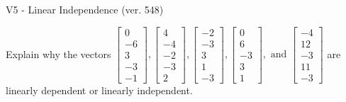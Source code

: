 \begin{exercise}
  \begin{exerciseTitle}V5 - Linear Independence (ver. 548)\end{exerciseTitle}
  \begin{exerciseStatement}
    Explain why the vectors \(\left[\begin{array}{r}
0 \\
-6 \\
3 \\
-3 \\
-1
\end{array}\right] , \left[\begin{array}{r}
4 \\
-4 \\
-2 \\
-3 \\
2
\end{array}\right] , \left[\begin{array}{r}
-2 \\
-3 \\
3 \\
1 \\
-3
\end{array}\right] , \left[\begin{array}{r}
0 \\
6 \\
-3 \\
3 \\
1
\end{array}\right] , \text{ and } \left[\begin{array}{r}
-4 \\
12 \\
-3 \\
11 \\
-3
\end{array}\right]\) are linearly dependent or linearly independent.	



\end{exerciseStatement}
\end{exercise}
